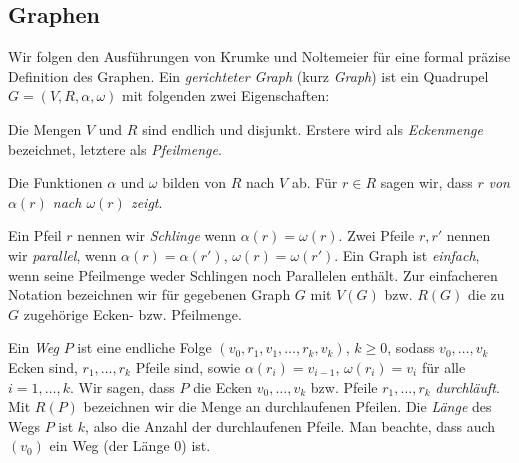 \documentclass[a4paper,10pt,abstract=true,headings=small]{scrartcl}
\begin{document}
\subsection{Graphen}

Wir folgen den Ausführungen von Krumke und Noltemeier für eine formal präzise Definition des Graphen.
Ein \emph{gerichteter Graph} (kurz \emph{Graph}) ist ein Quadrupel $G=(V,R,\alpha, \omega)$ mit folgenden zwei Eigenschaften:
\begin{enumerate*}
    \item Die Mengen $V$ und $R$ sind endlich und disjunkt.
        Erstere wird als \emph{Eckenmenge} bezeichnet, letztere als \emph{Pfeilmenge}.
    \item Die Funktionen $\alpha$ und $\omega$ bilden von $R$ nach $V$ ab.
        Für $r\in R$ sagen wir, dass $r$ \emph{von $\alpha(r)$ nach $\omega(r)$ zeigt}.
\end{enumerate*}


Ein Pfeil $r$ nennen wir \emph{Schlinge} wenn $\alpha(r)=\omega(r)$. Zwei Pfeile $r, r'$ nennen wir \emph{parallel}, wenn $\alpha(r)=\alpha(r')$, $\omega(r)=\omega(r')$.
Ein Graph ist \emph{einfach}, wenn seine Pfeilmenge weder Schlingen noch Parallelen enthält.\autocite[Vgl.][7--8]{krumke_graphentheoretische_2012}
Zur einfacheren Notation bezeichnen wir für gegebenen Graph $G$ mit $V(G)$ bzw. $R(G)$ die zu $G$ zugehörige Ecken- bzw. Pfeilmenge. %

Ein \emph{Weg} $P$ ist eine endliche Folge $(v_0,\allowbreak r_1,\allowbreak v_1, \dots, r_k, v_k)$, $k\geq 0$, sodass $v_0, \dots, v_k$ Ecken sind, $r_1, \dots, r_k$ Pfeile sind, sowie $\alpha(r_i) = v_{i-1}$, $\omega(r_i)=v_i$ für alle $i=1,\dots, k$.
Wir sagen, dass $P$ die Ecken $v_0, \dots, v_k$ bzw. Pfeile $r_1, \dots, r_k$ \emph{durchläuft}.
Mit $R(P)$ bezeichnen wir die Menge an durchlaufenen Pfeilen.
Die \emph{Länge} des Wegs $P$ ist $k$, also die Anzahl der durchlaufenen Pfeile.
Man beachte, dass auch $(v_0)$ ein Weg (der Länge $0$) ist.\autocite[Vgl.][31]{krumke_graphentheoretische_2012}
\end{document}

